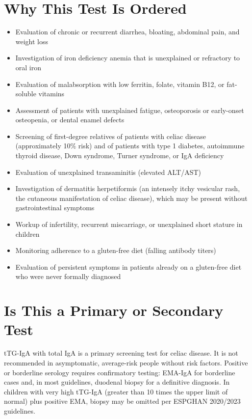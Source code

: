 \section*{Why This Test Is Ordered}
\begin{itemize}
  \item Evaluation of chronic or recurrent diarrhea, bloating, abdominal pain, and weight loss
  \item Investigation of iron deficiency anemia that is unexplained or refractory to oral iron
  \item Evaluation of malabsorption with low ferritin, folate, vitamin B12, or fat-soluble vitamins
  \item Assessment of patients with unexplained fatigue, osteoporosis or early-onset osteopenia, or dental enamel defects
  \item Screening of first-degree relatives of patients with celiac disease (approximately 10\% risk) and of patients with type 1 diabetes, autoimmune thyroid disease, Down syndrome, Turner syndrome, or IgA deficiency
  \item Evaluation of unexplained transaminitis (elevated ALT/AST)
  \item Investigation of dermatitis herpetiformis (an intensely itchy vesicular rash, the cutaneous manifestation of celiac disease), which may be present without gastrointestinal symptoms
  \item Workup of infertility, recurrent miscarriage, or unexplained short stature in children
  \item Monitoring adherence to a gluten-free diet (falling antibody titers)
  \item Evaluation of persistent symptoms in patients already on a gluten-free diet who were never formally diagnosed
\end{itemize}

\section*{Is This a Primary or Secondary Test}
tTG-IgA with total IgA is a primary screening test for celiac disease. It is not recommended in asymptomatic, average-risk people without risk factors. Positive or borderline serology requires confirmatory testing: EMA-IgA for borderline cases and, in most guidelines, duodenal biopsy for a definitive diagnosis. In children with very high tTG-IgA (greater than 10 times the upper limit of normal) plus positive EMA, biopsy may be omitted per ESPGHAN 2020/2023 guidelines.

